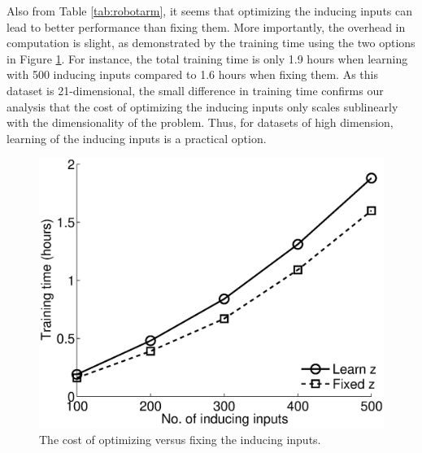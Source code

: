 Also from Table \ref{tab:robotarm}, it seems that optimizing the inducing inputs can lead to better performance than fixing them.
More importantly, the overhead in computation is slight, as demonstrated by the training time using the two options in Figure \ref{fig:time}.
For instance, the total training time is only 1.9 hours when learning with 500 inducing inputs compared to 1.6 hours when fixing them.
As this dataset is 21-dimensional, the small difference in training time confirms our analysis that the cost of optimizing the inducing inputs only scales sublinearly with the dimensionality of the problem.
Thus, for datasets of high dimension, learning of the inducing inputs is a practical option.

\begin{figure}
\includegraphics[scale=0.4]{figures/sarcosTime.eps}
\caption{The cost of optimizing versus fixing the inducing inputs.}
\label{fig:time}
\end{figure}
